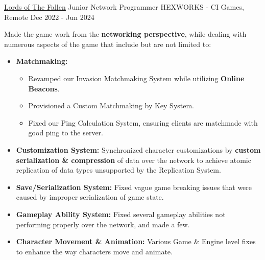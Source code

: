 

\begin{cventries}

  \cventry
    {\href{https://wizardcell.com/about/lords-of-the-fallen}{\underline{Lords of The Fallen}}} %
    {Junior Network Programmer} %
    {HEXWORKS - CI Games, Remote} %
    {Dec 2022 - Jun 2024} %
    {
      \begin{cvitems} %
        \item {Made the game work from the \textbf{networking perspective}, while dealing with numerous aspects of the game that include but are not limited to:
          \begin{itemize}
            \item {\textbf{Matchmaking:}
              \begin{itemize}
                \item {Revamped our Invasion Matchmaking System while utilizing \textbf{Online Beacons}.}
                \item {Provisioned a Custom Matchmaking by Key System.}
                \item {Fixed our Ping Calculation System, ensuring clients are matchmade with good ping to the server.}
              \end{itemize}
            }
            \item {\textbf{Customization System:} Synchronized character customizations by \textbf{custom serialization \& compression} of data over the network to achieve atomic replication of data types unsupported by the Replication System.}
            \item {\textbf{Save/Serialization System:} Fixed vague game breaking issues that were caused by improper serialization of game state.}
            \item {\textbf{Gameplay Ability System:} Fixed several gameplay abilities not performing properly over the network, and made a few.}
            \item {\textbf{Character Movement \& Animation:} Various Game \& Engine level fixes to enhance the way characters move and animate.}

\end{itemize}}
\end{cvitems}}
\end{cventries}
